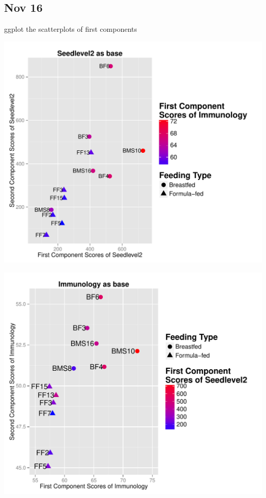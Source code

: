 \documentclass{article}\usepackage[]{graphicx}\usepackage[]{color}
\makeatletter
\def\maxwidth{ %
  \ifdim\Gin@nat@width>\linewidth
    \linewidth
  \else
    \Gin@nat@width
  \fi
}
\makeatother
\begin{document}
 \subsection{Nov 16}
 ggplot the scatterplots of first components
\begin{Schunk}


{\centering \includegraphics[width=\maxwidth]{figure/Nov_16-1} 

}



{\centering \includegraphics[width=\maxwidth]{figure/Nov_16-2} 

}

\end{Schunk}
\end{document}
